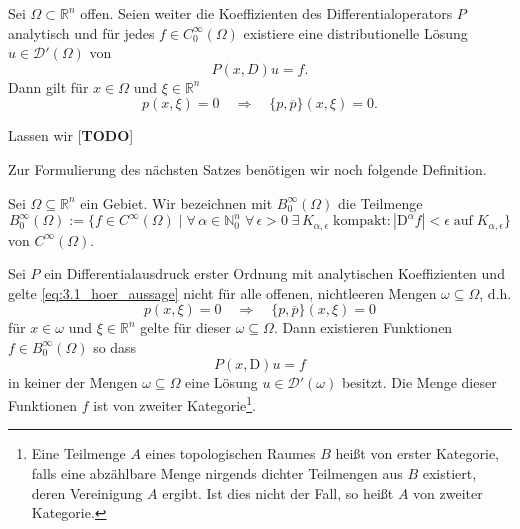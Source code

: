 \begin{thm}\label{thm:3.1_hoer}
Sei $\Omega\subset\mathbb{R}^n$ offen. Seien weiter die Koeffizienten des Differentialoperators $P$ analytisch und für jedes $f\in C_0^\infty(\Omega)$ existiere eine distributionelle Lösung $u\in\mathscr D'(\Omega)$ von
\begin{equation}\label{eq:3.1_hoer}
P(x,D)u=f.
\end{equation}
Dann gilt für $x\in\Omega$ und $\xi\in\mathbb{R}^n$
\begin{equation}\label{eq:3.1_hoer_aussage}
p(x,\xi)=0\quad\Rightarrow\quad \{p,\overline{p}\}(x,\xi)=0.
\end{equation}
\end{thm}

\begin{rem}
Lassen wir [\textbf{TODO}]
\end{rem}



Zur Formulierung des nächsten Satzes benötigen wir noch folgende Definition.

\begin{df}
Sei $\Omega\subseteq\mathbb{R}^n$ ein Gebiet. Wir bezeichnen mit $B_0^\infty(\Omega)$ die Teilmenge 
\begin{equation}
B_0^\infty(\Omega) :=\{f\in C^\infty(\Omega) \mid \forall\,\alpha\in\mathbb{N}_0^n\;\forall\,\epsilon >0\;\exists\,K_{\alpha,\epsilon}\;\mathrm{kompakt} : |\mathrm D^\alpha f|<\epsilon\;\mathrm{auf\;} K_{\alpha,\epsilon}\}
\end{equation}
von $C^\infty(\Omega)$.
\end{df}



\begin{thm}\label{thm:2_hoer}
Sei $P$ ein Differentialausdruck erster Ordnung mit analytischen Koeffizienten und gelte \eqref{eq:3.1_hoer_aussage} nicht für alle offenen, nichtleeren Mengen $\omega\subseteq\Omega$, d.h. 
\begin{equation}
p(x,\xi)=0 \quad\Rightarrow\quad \{p,\overline p\}(x,\xi)=0
\end{equation}
für $x\in\omega$ und $\xi\in\mathbb{R}^n$ gelte für  dieser $\omega\subseteq\Omega$.
Dann existieren Funktionen $f\in B_0^\infty(\Omega)$ so dass
\begin{equation}\label{lewy:pxDu=f}
P(x,\mathrm D)u=f
\end{equation}
in keiner der Mengen $\omega\subseteq\Omega$ eine Lösung $u\in\mathcal{D}'(\omega)$ besitzt. Die Menge dieser Funktionen $f$ ist von zweiter Kategorie\footnote{Eine Teilmenge $A$ eines topologischen Raumes $B$ heißt von erster Kategorie, falls eine abzählbare Menge nirgends dichter Teilmengen aus $B$ existiert, deren Vereinigung $A$ ergibt. Ist dies nicht der Fall, so heißt $A$ von zweiter Kategorie.}.
\end{thm}

